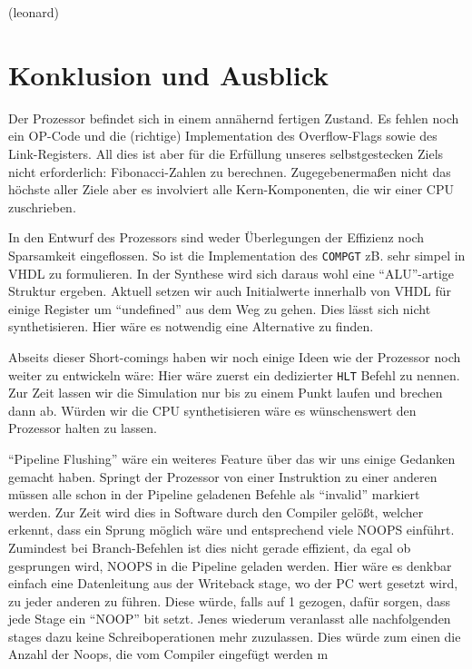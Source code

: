 \documentclass[paper=a4,fontsize=12pt,twocolumn]{scrreprt}
\begin{document}
(leonard)


\chapter{Konklusion und Ausblick}


Der Prozessor befindet sich in einem annähernd fertigen Zustand.
Es fehlen noch ein OP-Code und die (richtige) Implementation des Overflow-Flags sowie des Link-Registers.
All dies ist aber für die Erfüllung unseres selbstgestecken Ziels nicht erforderlich: Fibonacci-Zahlen zu berechnen.
Zugegebenermaßen nicht das höchste aller Ziele aber es involviert alle Kern-Komponenten, die wir einer CPU zuschrieben.

In den Entwurf des Prozessors sind weder Überlegungen der Effizienz noch Sparsamkeit eingeflossen.
So ist die Implementation des \texttt{COMPGT} zB. sehr simpel in VHDL zu formulieren.
In der Synthese wird sich daraus wohl eine \enquote{ALU}-artige Struktur ergeben.
Aktuell setzen wir auch Initialwerte innerhalb von VHDL für einige Register um \enquote{undefined} aus dem Weg zu gehen.
Dies lässt sich nicht synthetisieren.
Hier wäre es notwendig eine Alternative zu finden.

Abseits dieser Short-comings haben wir noch einige Ideen wie der Prozessor noch weiter zu entwickeln wäre:
Hier wäre zuerst ein dedizierter \texttt{HLT} Befehl zu nennen.
Zur Zeit lassen wir die Simulation nur bis zu einem Punkt laufen und brechen dann ab.
Würden wir die CPU synthetisieren wäre es wünschenswert den Prozessor halten zu lassen.

\enquote{Pipeline Flushing} wäre ein weiteres Feature über das wir uns einige Gedanken gemacht haben.
Springt der Prozessor von einer Instruktion zu einer anderen müssen alle schon in der Pipeline geladenen Befehle als \enquote{invalid} markiert werden.
Zur Zeit wird dies in Software durch den Compiler gelößt, welcher erkennt, dass ein Sprung möglich wäre und entsprechend viele NOOPS einführt.
Zumindest bei Branch-Befehlen ist dies nicht gerade effizient, da egal ob gesprungen wird, NOOPS in die Pipeline geladen werden.
Hier wäre es denkbar einfach eine Datenleitung aus der Writeback stage, wo der PC wert gesetzt wird, zu jeder anderen zu führen.
Diese würde, falls auf 1 gezogen, dafür sorgen, dass jede Stage ein \enquote{NOOP} bit setzt.
Jenes wiederum veranlasst alle nachfolgenden stages dazu keine Schreiboperationen mehr zuzulassen.
Dies würde zum einen die Anzahl der Noops, die vom Compiler eingefügt werden m
\end{document}
